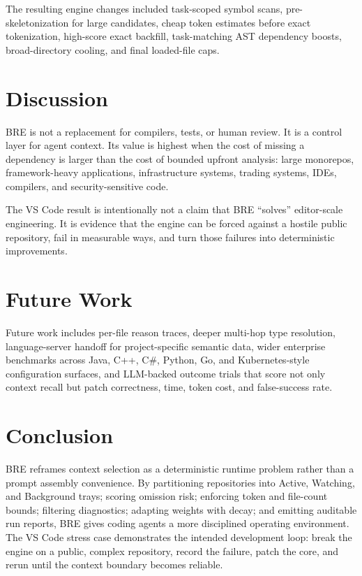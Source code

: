 \documentclass[10pt,twocolumn,letterpaper]{article}
\begin{document}
The resulting engine changes included task-scoped symbol scans, pre-skeletonization for large candidates, cheap token estimates before exact tokenization, high-score exact backfill, task-matching AST dependency boosts, broad-directory cooling, and final loaded-file caps.

\section{Discussion}
BRE is not a replacement for compilers, tests, or human review. It is a control layer for agent context. Its value is highest when the cost of missing a dependency is larger than the cost of bounded upfront analysis: large monorepos, framework-heavy applications, infrastructure systems, trading systems, IDEs, compilers, and security-sensitive code.

The VS Code result is intentionally not a claim that BRE ``solves'' editor-scale engineering. It is evidence that the engine can be forced against a hostile public repository, fail in measurable ways, and turn those failures into deterministic improvements.

\section{Future Work}
Future work includes per-file reason traces, deeper multi-hop type resolution, language-server handoff for project-specific semantic data, wider enterprise benchmarks across Java, C++, C\#, Python, Go, and Kubernetes-style configuration surfaces, and LLM-backed outcome trials that score not only context recall but patch correctness, time, token cost, and false-success rate.

\section{Conclusion}
BRE reframes context selection as a deterministic runtime problem rather than a prompt assembly convenience. By partitioning repositories into Active, Watching, and Background trays; scoring omission risk; enforcing token and file-count bounds; filtering diagnostics; adapting weights with decay; and emitting auditable run reports, BRE gives coding agents a more disciplined operating environment. The VS Code stress case demonstrates the intended development loop: break the engine on a public, complex repository, record the failure, patch the core, and rerun until the context boundary becomes reliable.
\end{document}
